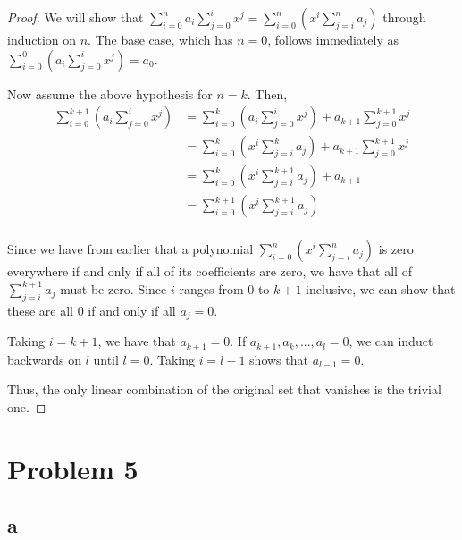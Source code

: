 \documentclass[12pt,letterpaper]{article}
\theoremstyle{definition}
\begin{document}
\begin{proof}


  We will show that $\sum_{i=0}^na_i\sum_{j=0}^ix^j =
  \sum_{i=0}^{n}(x^i\sum_{j=i}^{n}a_j)$ through induction on $n$. The base case,
  which has $n = 0$, follows immediately as $\sum_{i=0}^0(a_i\sum_{j=0}^ix^j) =
  a_0$.

  Now assume the above hypothesis for $n = k$. Then,
  \begin{align*}
    \sum_{i=0}^{k+1}(a_i\sum_{j=0}^ix^j) &= \sum_{i=0}^k(a_i\sum_{j=0}^ix^j) + a_{k+1}\sum_{j=0}^{k+1}x^j \\
                                         &= \sum_{i=0}^{k}(x^{i}\sum_{j=i}^{k}a_j) + a_{k+1}\sum_{j=0}^{k+1}x^j \\
                                         &= \sum_{i=0}^k(x^i\sum_{j=i}^{k+1}a_j) + a_{k+1}  \\
                                         &= \sum_{i=0}^{k+1}(x^i\sum_{j=i}^{k+1}a_j)  \\
  \end{align*}

  Since we have from earlier that a polynomial
  $\sum_{i=0}^{n}(x^i\sum_{j=i}^{n}a_j)$ is zero everywhere if and only if
  all of its coefficients are zero, we have that all of $\sum_{j=i}^{k+1}a_j$
  must be zero. Since $i$ ranges from 0 to $k+1$ inclusive, we can show that these
  are all $0$ if and only if all $a_j = 0$.

  Taking $i = k + 1$, we have that $a_{k+1} = 0$. If $a_{k+1}, a_{k}, ..., a_{l}
  = 0$, we can induct backwards on $l$ until $l = 0$. Taking $i = l - 1$ shows
  that $a_{l - 1} = 0$.

  Thus, the only linear combination of the original set that vanishes is the
  trivial one.
\end{proof}

\section*{Problem 5}

\subsection*{a}
\end{document}
